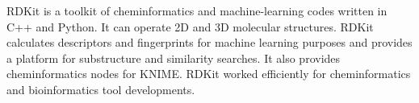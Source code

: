 RDKit is a toolkit of cheminformatics and machine-learning codes written in C++ and Python. It can operate 2D and 3D molecular structures. RDKit calculates descriptors and fingerprints for machine learning purposes and provides a platform for substructure and similarity searches. It also provides cheminformatics nodes for KNIME. RDKit worked efficiently for cheminformatics and bioinformatics tool developments.